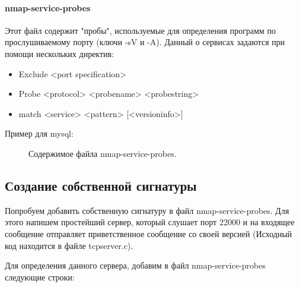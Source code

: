 \documentclass[10pt,a4paper]{report}
\begin{document}
\paragraph{nmap-service-probes\\}

Этот файл содержит "пробы", используемые для определения программ по прослушиваемому порту (ключи -sV и -A). Данный о сервисах задаются при помощи нескольких директив:
\begin{itemize}
	\item Exclude <port specification>
	\item Probe <protocol> <probename> <probestring>
	\item match <service> <pattern> [<versioninfo>]
\end{itemize}

Пример для mysql:

\begin{figure}[h!]	
	\caption{Содержимое файла nmap-service-probes.}
	\label{Img:6}
\end{figure}

\subsection{Создание собственной сигнатуры}

Попробуем добавить собственную сигнатуру в файл nmap-service-probes. Для этого напишем простейший сервер, который слушает порт 22000 и на входящее сообщение отправляет приветственное сообщение со своей версией (Исходный код находится в файле tcpserver.c). 

Для определения данного сервера, добавим в файл nmap-service-probes следующие строки:
\end{document}
